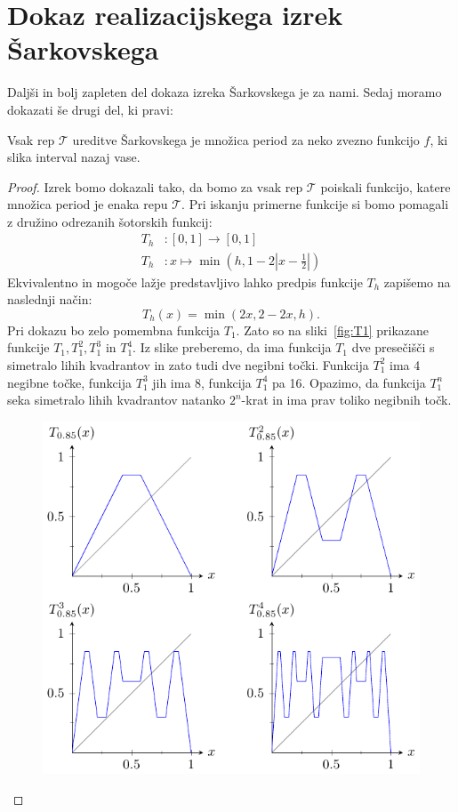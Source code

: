 \documentclass[mat2]{fmfdelo}
\begin{document}
\section{Dokaz realizacijskega izrek Šarkovskega}\label{sec:realizacija}
Daljši in bolj zapleten del dokaza izreka Šarkovskega je za nami. Sedaj moramo dokazati še drugi del, ki pravi:
\begin{izrek}
Vsak rep $\mathcal{T}$ ureditve Šarkovskega je množica period za neko zvezno funkcijo $f$, ki slika interval nazaj vase.
\end{izrek}
\begin{proof}
Izrek bomo dokazali tako, da bomo za vsak rep $\mathcal{T}$ poiskali funkcijo, katere množica period je enaka repu $\mathcal{T}$. Pri iskanju primerne funkcije si bomo pomagali z družino odrezanih šotorskih funkcij:
\begin{equation*} %
\begin{split}
T_h &:  [0, 1] \to [0, 1] \\ 
T_h &: x \mapsto \min \left(h, 1- 2 \left|x-\frac{1}{2} \right|\right)
\end{split}
\end{equation*}
Ekvivalentno in mogoče lažje predstavljivo lahko predpis funkcije $T_h$ zapišemo na naslednji način:
\begin{equation*} %
T_h(x) = \min(2x, 2-2x, h).
\end{equation*}
Pri dokazu bo zelo pomembna funkcija $T_1$. Zato so na sliki~\ref{fig:T1} prikazane funkcije $T_1, T_1^2, T_1^3$ in $T_1^4$. Iz slike preberemo, da ima funkcija $T_1$ dve presečišči s simetralo lihih kvadrantov in zato tudi dve negibni točki. Funkcija $T_1^2$ ima 4 negibne točke, funkcija $T_1^3$ jih ima 8, funkcija $T_1^4$ pa 16. Opazimo, da funkcija $T_1^n$ seka simetralo lihih kvadrantov natanko $2^n$-krat in ima prav toliko negibnih točk. 
\begin{figure}[h]
  \centering
  \includegraphics{images/odrezana_funkcija.pdf}

\end{figure}
\end{proof}
\end{document}
